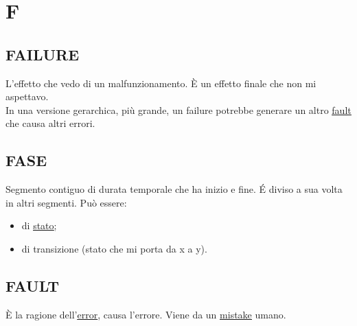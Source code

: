 \newpage
	\section{F} \label{sec:F}
	
		\subsection{FAILURE}		\label{failure}	%
		L'effetto che vedo di un malfunzionamento. È un effetto finale che non mi aspettavo. \\
		In una versione gerarchica, più grande, un failure potrebbe generare un altro \underline{\hyperref[fault]{fault}} che causa altri errori. %
	
		\subsection{FASE}  \label{fase}  
		Segmento contiguo di durata temporale che ha inizio e fine. É diviso a sua volta in altri segmenti. Può essere:
		\begin{itemize}
			\item di \underline{\hyperref[stato]{stato}};
			\item di transizione (stato che mi porta da x a y).
		\end{itemize}
	
		\subsection{FAULT}		\label{fault}
		È la ragione dell'\underline{\hyperref[error]{error}}, causa l'errore. Viene da un \underline{\hyperref[mistake]{mistake}} umano.
		
	
	

